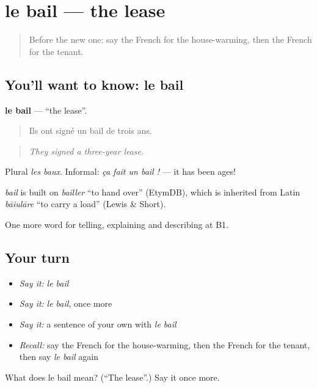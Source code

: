 \section[le bail]{le bail — the lease}

\label{lesson:FR-C312-bail}



\begin{quote}
Before the new one: say the French for the house-warming, then the French for the tenant.
\end{quote}

\subsection*{You'll want to know: le bail}
\textbf{le bail} — \textquotedblleft{}the lease\textquotedblright{}.

\begin{quote}
Ils ont signé un bail de trois ans.
\end{quote}

\begin{quote}
\emph{They signed a three-year lease.}
\end{quote}

Plural \emph{les baux}. Informal: \emph{ça fait un bail !} — it has been ages!

\begin{cousinweb}
\emph{bail} is built on \emph{bailler} \textquotedblleft{}to hand over\textquotedblright{} (EtymDB), which is inherited from Latin \emph{bāiulāre} \textquotedblleft{}to carry a load\textquotedblright{} (Lewis \& Short).
\end{cousinweb}

\begin{grammarlens}[title={What you've built}]
One more word for telling, explaining and describing at B1.
\end{grammarlens}

\subsection*{Your turn}
\begin{itemize}
\raggedright
  \item \emph{Say it:} \emph{le bail}
  \item \emph{Say it:} \emph{le bail}, once more
  \item \emph{Say it:} a sentence of your own with \emph{le bail}
  \item \emph{Recall:} say the French for the house-warming, then the French for the tenant, then say \emph{le bail} again
\end{itemize}

\begin{tcolorbox}[breakable,colback=teal!4,colframe=teal!35!black,title={Before you move on}]
What does le bail mean? (\textquotedblleft{}The lease\textquotedblright{}.) Say it once more.
\end{tcolorbox}
